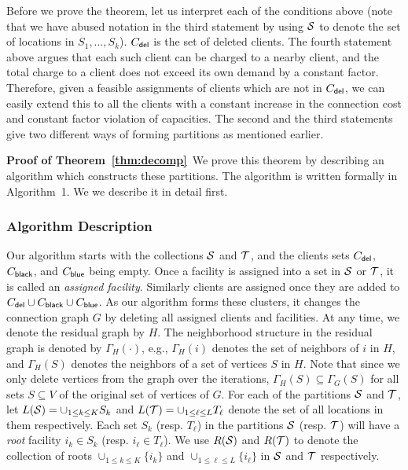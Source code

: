 Before we prove the theorem, let us interpret each of the conditions above (note that we have abused notation in the third statement by using ${\cal S}$ to
denote the set of locations in $S_1, \ldots, S_k$). $C_{\mathsf{del}}$ is the set of deleted clients. The fourth statement above argues that each such  client can be charged to a nearby client, and  the total charge to a client does not exceed its own demand by a constant factor. Therefore, given a feasible assignments of clients which are not in $C_{\mathsf{del}}$, we can easily extend this to all the clients with a constant increase in the connection cost and constant factor violation of capacities. The second and the third statements give two different ways of forming partitions as mentioned earlier. 

\vspace*{0.1 in}
\noindent
{\bf Proof of Theorem~\ref{thm:decomp}}\ 
We prove this theorem by describing an algorithm which constructs these partitions.
The algorithm is written formally in Algorithm~1. We
we describe it in detail first.

\subsubsection{Algorithm Description}
Our algorithm starts with the collections ${\cal S}$ and ${\cal T}$, and the clients sets $C_{\mathsf{del}}$, $C_{\mathsf{black}}$, and $C_{\mathsf{blue}}$ being empty. Once a facility is assigned into a set in ${\cal S}$ or ${\cal T}$, it is called an \emph{assigned facility}. Similarly clients are assigned once they are added to $C_{\mathsf{del}} \cup C_{\mathsf{black}} \cup C_{\mathsf{blue}}$.
As our algorithm forms these clusters, it changes the connection graph $G$ by deleting all assigned clients and facilities. At any time, we denote the residual graph by $H$. The neighborhood structure in the residual graph is denoted by $\Gamma_H(\cdot)$, e.g., $\Gamma_H(i)$ denotes the set of neighbors of $i$ in $H$, and $\Gamma_H(S)$ denotes the neighbors of a set of vertices $S$ in $H$. Note that since we only delete vertices from the graph over the iterations, $\Gamma_H(S) \subseteq \Gamma_G(S)$ for all sets $S \subseteq V$ of the original set of vertices of $G$. For each of the partitions ${\cal S}$ and ${\cal T}$, let $L({\cal S}) = \cup_{1\leq k \leq K} S_k$ and $L({\cal T}) = \cup_{1 \leq \ell \leq L} T_\ell$ denote the set of all locations in them respectively.
Each set $S_k$ (resp. $T_\ell$) in the partitions ${\cal S}$ (resp. ${\cal T}$) will have a {\em root} facility $i_k \in S_k$ (resp. $i_\ell \in T_\ell$). We use $R({\cal S})$ and $R({\cal T})$ to denote the collection of roots $\cup_{1 \leq k \leq K} \{i_k\}$ and $\cup_{1 \leq \ell \leq L} \{i_\ell\}$ in ${\cal S}$ and ${\cal T}$ respectively.



